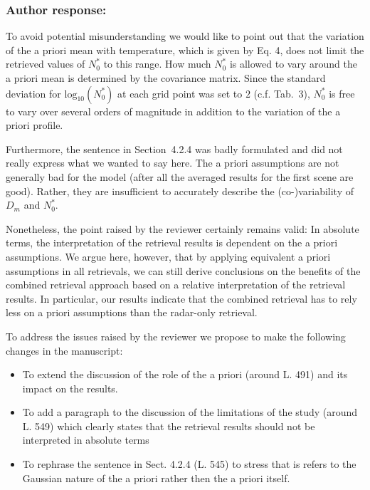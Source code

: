 \documentclass[11pt]{scrartcl}
\begin{document}
\subsubsection*{Author response:}

To avoid potential misunderstanding we would like to point out that the
variation of the a priori mean with temperature, which is given by Eq. 4, does
not limit the retrieved values of $N_0^*$ to this range. How much $N_0^*$ is
allowed to vary around the a priori mean is determined by the covariance matrix.
Since the standard deviation for $\text{log}_{10}(N_0^*)$ at each grid point was
set to $2$ (c.f. Tab.~3), $N_0^*$ is free to vary over several orders of
magnitude in addition to the variation of the a priori profile.

Furthermore, the sentence in Section~4.2.4 was badly formulated and did not
really express what we wanted to say here. The a priori assumptions are not
generally bad for the model (after all the averaged results for the first scene
are good). Rather, they are insufficient to accurately describe the (co-)variability
of $D_m$ and $N_0^*$.

Nonetheless, the point raised by the reviewer certainly remains valid: In
absolute terms, the interpretation of the retrieval results is dependent on the
a priori assumptions. We argue here, however, that by applying equivalent a
priori assumptions in all retrievals, we can still derive conclusions on the
benefits of the combined retrieval approach based on a relative interpretation
of the retrieval results. In particular, our results indicate that the combined
retrieval has to rely less on a priori assumptions than the radar-only
retrieval. 

To address the issues raised by the reviewer we propose to make the following
changes in the manuscript:

\begin{itemize}
\item To extend the discussion of the role of the a priori (around L. 491) and
  its impact on the results.
\item To add a paragraph to the discussion of the limitations of the study (around L. 549)
  which clearly states that the retrieval results should not be interpreted in absolute terms
\item To rephrase the sentence in Sect. 4.2.4 (L. 545) to stress that is refers to the
  Gaussian nature of the a priori rather then the a priori itself.
\end{itemize}
\end{document}
